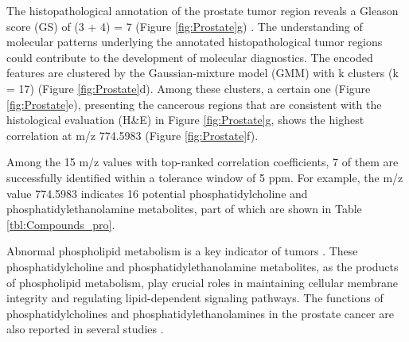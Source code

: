 \documentclass{WileyMSP-template}
\begin{document}
The histopathological annotation of the prostate tumor region reveals 
a Gleason score (GS) of (3 + 4) = 7 (Figure \ref{fig:Prostate}g) \cite{gleason1974prediction}. 
The understanding of molecular patterns underlying 
the annotated histopathological tumor regions could contribute to the development 
of molecular diagnostics. The encoded features are clustered by the Gaussian-mixture 
model (GMM) with k clusters (k = 17) (Figure \ref{fig:Prostate}d). 
Among these clusters, a certain one (Figure \ref{fig:Prostate}e), 
presenting the cancerous regions that are consistent with the 
histological evaluation (H\&E) in Figure \ref{fig:Prostate}g, 
shows the highest correlation at m/z 774.5983 (Figure \ref{fig:Prostate}f). 



Among the 15 m/z values with top-ranked correlation coefficients, 
7 of them are successfully identified within a tolerance window of 5 ppm. 
For example, the m/z value 774.5983 
indicates 16 potential phosphatidylcholine 
and phosphatidylethanolamine metabolites, 
part of which are shown in Table \ref{tbl:Compounds_pro}. 

Abnormal phospholipid metabolism is a key indicator of tumors  
\cite{currie2013inequality}. 
These phosphatidylcholine and 
phosphatidylethanolamine metabolites, as the products of phospholipid metabolism, 
play crucial roles in maintaining cellular 
membrane integrity and regulating lipid-dependent signaling pathways. 
The functions of phosphatidylcholines and phosphatidylethanolamines in the 
prostate cancer are also reported in several studies 
\cite{chianese2022histone} \cite{lagemaat2014phosphorus} \cite{kwan2021synthesis}
\cite{mori2016tumor} \cite{cornel1993characterization}
\cite{lagemaat2014phosphorus}.
 
\end{document}
